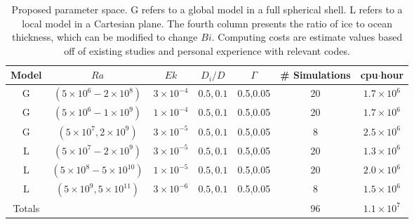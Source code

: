 \documentclass[12pt]{article}
\def\lb{\left(}
\def\rb{\right)}
\begin{document}
\begin{table}
\begin{center}
\begin{tabular}{|c|c|c|c|c|c|c|}
\hline
Model&$Ra$&$Ek$&$D_{i}/D$& $\Gamma$ &\# Simulations & cpu$\cdot$hour\\
		\hline
G&$\lb 5 \times 10^{6} - 2 \times 10^{8} \rb $ & $3 \times 10^{-4} $ & $0.5,0.1$&0.5,0.05&20&$1.7 \times 10^{6}$\\
  	\hline
G&$\lb 5 \times 10^{6} - 1 \times 10^{9} \rb $ & $1 \times 10^{-4} $ & $0.5,0.1$&0.5,0.05&20&$1.7\times 10^{6}$\\
  	\hline
G&$\lb 5\times 10^{7}, 2 \times 10^{9} \rb $ & $3 \times 10^{-5} $ & $0.5,0.1$&0.5,0.05&8&$2.5\times 10^6$\\
		\hline
L&$\lb 5 \times 10^{7} - 2 \times 10^{9} \rb $ & $3 \times 10^{-5} $ & $0.5,0.1$&0.5,0.05&20&$1.3 \times 10^{6}$\\
  	\hline
L&$\lb 5 \times 10^{8} - 5 \times 10^{10} \rb $ & $1 \times 10^{-5} $ & $0.5,0.1$&0.5,0.05&20&$2.0\times 10^{6}$\\
  	\hline
L&$\lb 5\times 10^{9}, 5 \times 10^{11} \rb $ & $3 \times 10^{-6} $ & $0.5,0.1$&0.5,0.05&8&$1.5\times 10^6$\\
		\hline
		\hline
Totals & && & &96&$1.1 \times 10^7$ \\
		\hline
\end{tabular}
\end{center}
\caption{Proposed parameter space. G refers to a global model in a full spherical shell. L refers to a local model in a Cartesian plane. The fourth column presents the ratio of ice to ocean thickness, which can be modified to change $Bi$. Computing costs are estimate values based off of existing studies \citep{dL23,rM19} and personal experience with relevant codes.}
\label{t:param}
\end{table}
\end{document}
